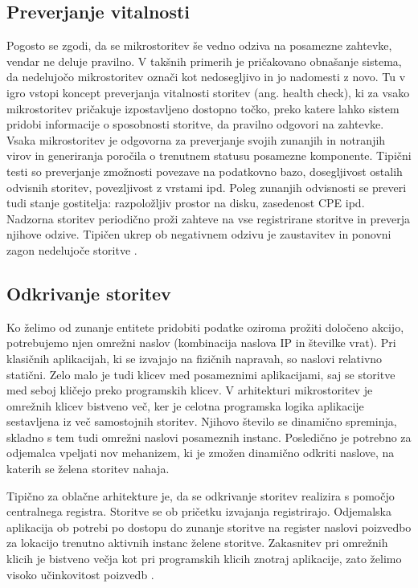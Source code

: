 \documentclass[a4paper, 12pt]{book}
\begin{document}
\subsection{Preverjanje vitalnosti}

Pogosto se zgodi, da se mikrostoritev še vedno odziva na posamezne zahtevke, vendar ne deluje pravilno.
V takšnih primerih je pričakovano obnašanje sistema, da nedelujočo mikrostoritev označi kot nedosegljivo in jo nadomesti z novo.
Tu v igro vstopi koncept preverjanja vitalnosti storitev (ang. health check), ki za vsako mikrostoritev pričakuje izpostavljeno dostopno točko, preko katere lahko sistem pridobi informacije o sposobnosti storitve, da pravilno odgovori na zahtevke.
Vsaka mikrostoritev je odgovorna za preverjanje svojih zunanjih in notranjih virov in generiranja poročila o trenutnem statusu posamezne komponente.
Tipični testi so preverjanje zmožnosti povezave na podatkovno bazo, dosegljivost ostalih odvisnih storitev, povezljivost z vrstami ipd.
Poleg zunanjih odvisnosti se preveri tudi stanje gostitelja: razpoložljiv prostor na disku, zasedenost CPE ipd.
Nadzorna storitev periodično proži zahteve na vse registrirane storitve in preverja njihove odzive.
Tipičen ukrep ob negativnem odzivu je zaustavitev in ponovni zagon nedelujoče storitve \cite{healthCheck}.

\subsection{Odkrivanje storitev}

Ko želimo od zunanje entitete pridobiti podatke oziroma prožiti določeno akcijo, potrebujemo njen omrežni naslov (kombinacija naslova IP in številke vrat).
Pri klasičnih aplikacijah, ki se izvajajo na fizičnih napravah, so naslovi relativno statični.
Zelo malo je tudi klicev med posameznimi aplikacijami, saj se storitve med seboj kličejo preko programskih klicev.
V arhitekturi mikrostoritev je omrežnih klicev bistveno več, ker je celotna programska logika aplikacije sestavljena iz več samostojnih storitev.
Njihovo število se dinamično spreminja, skladno s tem tudi omrežni naslovi posameznih instanc.
Posledično je potrebno za odjemalca vpeljati nov mehanizem, ki je zmožen dinamično odkriti naslove, na katerih se želena storitev nahaja.

Tipično za oblačne arhitekture je, da se odkrivanje storitev realizira s pomočjo centralnega registra.
Storitve se ob pričetku izvajanja registrirajo.
Odjemalska aplikacija ob potrebi po dostopu do zunanje storitve na register naslovi poizvedbo za lokacijo trenutno aktivnih instanc želene storitve.
Zakasnitev pri omrežnih klicih je bistveno večja kot pri programskih klicih znotraj aplikacije, zato želimo visoko učinkovitost poizvedb \cite{serviceDiscovery, maldip}.
\end{document}
